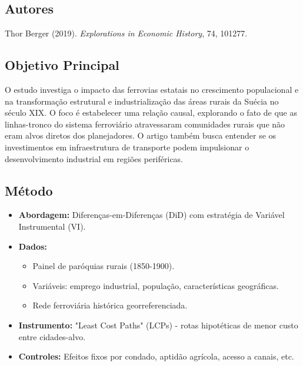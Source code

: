 \documentclass[12pt]{article}
\begin{document}
\subsection*{Autores}
Thor Berger (2019). \textit{Explorations in Economic History}, 74, 101277.

\subsection*{Objetivo Principal}
O estudo investiga o impacto das ferrovias estatais no crescimento populacional e na transformação estrutural e industrialização das áreas rurais da Suécia no século XIX. O foco é estabelecer uma relação causal, explorando o fato de que as linhas-tronco do sistema ferroviário atravessaram comunidades rurais que não eram alvos diretos dos planejadores. O artigo também busca entender se os investimentos em infraestrutura de transporte podem impulsionar o desenvolvimento industrial em regiões periféricas.

\subsection*{Método}
\begin{itemize}[leftmargin=*]
    \item \textbf{Abordagem:} Diferenças-em-Diferenças (DiD) com estratégia de Variável Instrumental (VI).
    \item \textbf{Dados:}
    \begin{itemize}
        \item Painel de paróquias rurais (1850-1900).
        \item Variáveis: emprego industrial, população, características geográficas.
        \item Rede ferroviária histórica georreferenciada.
    \end{itemize}
    \item \textbf{Instrumento:} "Least Cost Paths" (LCPs) - rotas hipotéticas de menor custo entre cidades-alvo.
    \item \textbf{Controles:} Efeitos fixos por condado, aptidão agrícola, acesso a canais, etc.
\end{itemize}
\end{document}
